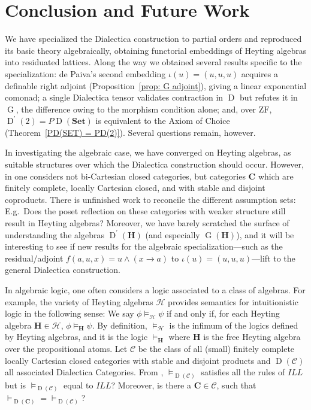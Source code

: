 \documentclass[reqno]{amsart}
\theoremstyle{plain}
\theoremstyle{definition}
\newcommand{\Set}{\mathbf{Set}}
\DeclareMathOperator{\D}{D}
\DeclareMathOperator{\G}{G}
\newcommand{\cf}[1]{\mathbf{#1}}
\begin{document}
\section{Conclusion and Future Work}

We have specialized the Dialectica construction to partial orders and reproduced its basic theory algebraically, obtaining functorial embeddings of Heyting algebras into residuated lattices. Along the way we obtained several results specific to the specialization: de Paiva's second embedding $\iota(u) = (u,u,u)$ acquires a definable right adjoint (Proposition~\ref{prop: G adjoint}), giving a linear exponential comonad; a single Dialectica tensor validates contraction in $\D$ but refutes it in $\G$, the difference owing to the morphism condition alone; and, over $\mathrm{ZF}$, $\D^{\prime}(2) = P\D(\Set)$ is equivalent to the Axiom of Choice (Theorem~\ref{PD(SET) = PD(2)}). Several questions remain, however.

In investigating the algebraic case, we have converged on Heyting algebras, as suitable structures over which the Dialectica construction should occur. However, in \cite{dePaiva1991} one considers not bi-Cartesian closed categories, but categories $\cf{C} $ which are finitely complete, locally Cartesian closed, and with stable and disjoint coproducts. There is unfinished work to reconcile the different assumption sets: E.g.\ Does the poset reflection on these categories with weaker structure still result in Heyting algebras? Moreover, we have barely scratched the surface of understanding the algebras $ \D^{\prime}(\mathbf{H}) $ (and especially $\G(\cf{H})$), and it will be interesting to see if new results for the algebraic specialization---such as the residual/adjoint $f(a,u,x) = u \wedge (x \rightarrow a) $ to $ \iota(u) = (u,u,u)$---lift to the general Dialectica construction. 

In algebraic logic, one often considers a logic associated to a class of algebras. For example, the variety of Heyting algebras $\mathcal{H} $ provides semantics for intuitionistic logic in the following sense: We say $\phi \vDash_{\mathcal{H}} \psi$ if and only if, for each Heyting algebra $\cf{H} \in \mathcal{H} $, $\phi \vDash_{\cf{H}} \psi$. By definition, $\vDash_{\mathcal{H}} $ is the infimum of the logics defined by Heyting algebras, and it is the logic $\vDash_{\cf{H}}$ where $\cf{H} $ is the free Heyting algebra over the propositional atoms. Let $\mathcal{C}$ be the class of all (small) finitely complete locally Cartesian closed categories with stable and disjoint products and $\D(\mathcal{C}) $ all associated Dialectica Categories. From \cite{dePaiva1991}, ${\vDash_{\D (\mathcal{C})}} $ satisfies all the rules of $ILL$ but is $\vDash_{\D(\mathcal{C})}$ equal to $ILL$? Moreover, is there a $\cf{C} \in \mathcal{C}$, such that ${\vDash_{\D(\cf{C})}} = {\vDash_{\D(\mathcal{C})}}$? 
\end{document}
